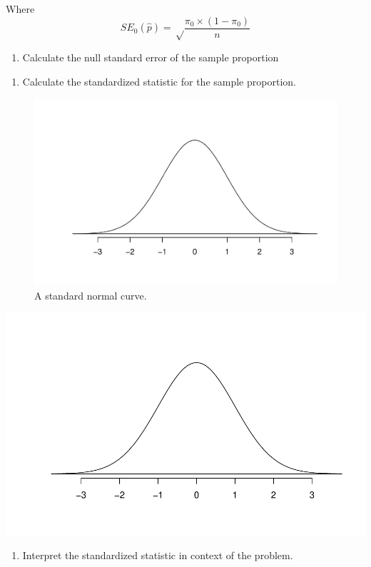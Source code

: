 \documentclass[
]{report}
\providecommand{\tightlist}{%
  \setlength{\itemsep}{0pt}\setlength{\parskip}{0pt}}
\begin{document}
Where \[SE_0(\hat{p})=\sqrt\frac{\pi_0\times (1-\pi_0)}{n}\]

\begin{enumerate}
\def\labelenumi{\arabic{enumi}.}
\setcounter{enumi}{5}
\tightlist
\item
  Calculate the null standard error of the sample proportion
\end{enumerate}

\vspace{0.6in}

\begin{enumerate}
\def\labelenumi{\arabic{enumi}.}
\setcounter{enumi}{6}
\tightlist
\item
  Calculate the standardized statistic for the sample proportion.
\end{enumerate}

\vspace{0.4in}

\begin{figure}

{\centering \includegraphics[width=0.5\linewidth]{05-UR-module4_review_files/figure-latex/simpleNormalcurve-1} 

}

\caption{A standard normal curve.}\label{fig:simpleNormalcurve}
\end{figure}

\begin{center}\includegraphics[width=0.5\linewidth]{05-UR-module4_review_files/figure-latex/Normcurve-1} \end{center}

\newpage

\begin{enumerate}
\def\labelenumi{\arabic{enumi}.}
\setcounter{enumi}{7}
\tightlist
\item
  Interpret the standardized statistic in context of the problem.
\end{enumerate}
\end{document}
